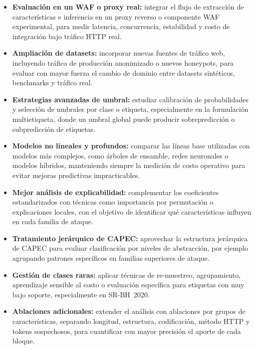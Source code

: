 \documentclass[12pt,oneside]{report}
\begin{document}
\begin{itemize}[leftmargin=*]
  \item \textbf{Evaluación en un WAF o proxy real:} integrar el flujo de extracción de características e inferencia en un proxy reverso o componente WAF experimental, para medir latencia, concurrencia, estabilidad y costo de integración bajo tráfico HTTP real.
  \item \textbf{Ampliación de datasets:} incorporar nuevas fuentes de tráfico web, incluyendo tráfico de producción anonimizado o nuevos honeypots, para evaluar con mayor fuerza el cambio de dominio entre datasets sintéticos, benchmarks y tráfico real.
  \item \textbf{Estrategias avanzadas de umbral:} estudiar calibración de probabilidades y selección de umbrales por clase o etiqueta, especialmente en la formulación multietiqueta, donde un umbral global puede producir sobrepredicción o subpredicción de etiquetas.
  \item \textbf{Modelos no lineales y profundos:} comparar las líneas base utilizadas con modelos más complejos, como árboles de ensamble, redes neuronales o modelos híbridos, manteniendo siempre la medición de costo operativo para evitar mejoras predictivas impracticables.
  \item \textbf{Mejor análisis de explicabilidad:} complementar los coeficientes estandarizados con técnicas como importancia por permutación o explicaciones locales, con el objetivo de identificar qué características influyen en cada familia de ataque.
  \item \textbf{Tratamiento jerárquico de CAPEC:} aprovechar la estructura jerárquica de CAPEC para evaluar clasificación por niveles de abstracción, por ejemplo agrupando patrones específicos en familias superiores de ataque.
  \item \textbf{Gestión de clases raras:} aplicar técnicas de re-muestreo, agrupamiento, aprendizaje sensible al costo o evaluación específica para etiquetas con muy bajo soporte, especialmente en SR-BH~2020.
  \item \textbf{Ablaciones adicionales:} extender el análisis con ablaciones por grupos de características, separando longitud, estructura, codificación, método HTTP y tokens sospechosos, para cuantificar con mayor precisión el aporte de cada bloque.
\end{itemize}

\appendix
\end{document}
